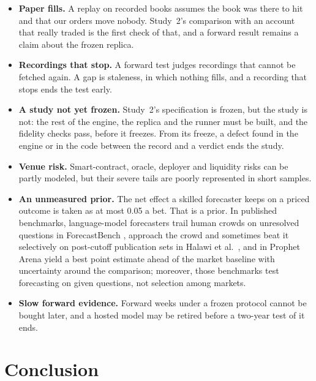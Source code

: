\documentclass[11pt]{article}
\begin{document}
\begin{itemize}
  \item \textbf{Paper fills.} A replay on recorded books assumes the book was there to hit and that our orders move nobody. Study~2's comparison with an account that really traded is the first check of that, and a forward result remains a claim about the frozen replica.
  \item \textbf{Recordings that stop.} A forward test judges recordings that cannot be fetched again. A gap is staleness, in which nothing fills, and a recording that stops ends the test early.
  \item \textbf{A study not yet frozen.} Study~2's specification is frozen, but the study is not: the rest of the engine, the replica and the runner must be built, and the fidelity checks pass, before it freezes. From its freeze, a defect found in the engine or in the code between the record and a verdict ends the study.
  \item \textbf{Venue risk.} Smart-contract, oracle, deployer and liquidity risks can be partly modeled, but their severe tails are poorly represented in short samples.
  \item \textbf{An unmeasured prior.} The net effect a skilled forecaster keeps on a priced outcome is taken as at most 0.05 a bet. That is a prior. In published benchmarks, language-model forecasters trail human crowds on unresolved questions in ForecastBench \cite{karger2025}, approach the crowd and sometimes beat it selectively on post-cutoff publication sets in Halawi et al.\ \cite{halawi2024}, and in Prophet Arena \cite{prophetarena2025} yield a best point estimate ahead of the market baseline with uncertainty around the comparison; moreover, those benchmarks test forecasting on given questions, not selection among markets.
  \item \textbf{Slow forward evidence.} Forward weeks under a frozen protocol cannot be bought later, and a hosted model may be retired before a two-year test of it ends.
\end{itemize}

\section{Conclusion}\label{sec:conclusion}
\end{document}
